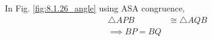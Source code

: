 \item 	In Fig. \ref{fig:8.1.26_angle} using ASA congruence,
\begin{align}
\triangle APB &\cong \triangle AQB
\\
\implies BP = BQ
\end{align}
